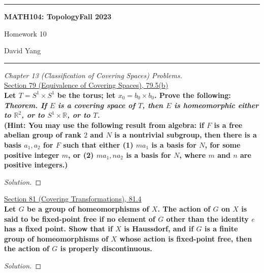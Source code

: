 \documentclass[11pt]{article}
\newcommand{\R}{\mathbb{R}}
\newenvironment{solution}
  {\renewcommand\qedsymbol{$\blacksquare$}\begin{proof}[Solution]}
  {\end{proof}}
\begin{document}
	\hrule
	\begin{center}
        \textbf{MATH104: Topology}\hfill \textbf{Fall 2023}\newline

		{\Large Homework 10}

		David Yang
	\end{center}

\hrule

\vspace{1em}

\textit{Chapter 13 (Classification of Covering Spaces) Problems.} \\

\underline{Section 79 (Equivalence of Covering Spaces), 79.5(b)} \\

\textbf{Let $T = S^1 \times S^1$ be the torus; let $x_0 = b_0 \times b_0$. Prove the following:} \\

\textbf{\textit{Theorem. If $E$ is a covering space of $T$, then $E$ is homeomorphic either to $\R^2$, or to $S^1 \times \R$, or to $T$.}} \\

\textbf{(Hint: You may use the following result from algebra: if $F$ is a free abelian group of rank $2$ and $N$ is a nontrivial subgroup, then there is a basis $a_1, a_2$ for $F$ 
such that either (1) $ma_1$ is a basis for $N$, for some positive integer $m$,
or (2) $ma_1, na_2$ is a basis for $N$, where $m$ and $n$ are positive integers.)}

\begin{solution}

\end{solution}

\newpage

\underline{Section 81 (Covering Transformations), 81.4} \\

\textbf{Let $G$ be a group of homeomorphisms of $X$. The action of $G$ on $X$ is said to be fixed-point free if no element of $G$ other than the identity $e$ has a fixed point. 
Show that if $X$ is Haussdorf, and if $G$ is a finite group of homeomorphisms of $X$ whose action is fixed-point free, then the action of $G$ is properly discontinuous.}

\begin{solution}

\end{solution}
\end{document}
